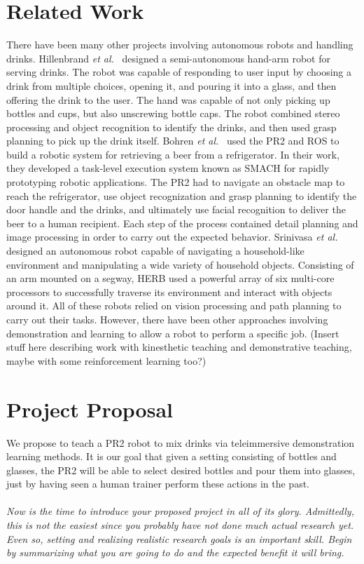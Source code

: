 \documentclass{sig-alternate}
\begin{document}
\section{Related Work}
\label{sec:related_work}
There have been many other projects involving autonomous robots and handling drinks. Hillenbrand \textit{et al.}~\cite{pouring_arm} designed a semi-autonomous hand-arm robot for serving drinks. The robot was capable of responding to user input by choosing a drink from multiple choices, opening it, and pouring it into a glass, and then offering the drink to the user. The hand was capable of not only picking up bottles and cups, but also unscrewing bottle caps. The robot combined stereo processing and object recognition to identify the drinks, and then used grasp planning to pick up the drink itself. Bohren \textit{et al.}~\cite{beer} used the PR2 and ROS to build a robotic system for retrieving a beer from a refrigerator. In their work, they developed a task-level execution system known as SMACH for rapidly prototyping robotic applications. The PR2 had to navigate an obstacle map to reach the refrigerator, use object recognization and grasp planning to identify the door handle and the drinks, and ultimately use facial recognition to deliver the beer to a human recipient. Each step of the process contained detail planning and image processing in order to carry out the expected behavior. Srinivasa \textit{et al.}~\cite{herb} designed an autonomous robot capable of navigating a household-like environment and manipulating a wide variety of household objects. Consisting of an arm mounted on a segway, HERB used a powerful array of six multi-core processors to successfully traverse its environment and interact with objects around it.
All of these robots relied on vision processing and path planning to carry out their tasks. However, there have been other approaches involving demonstration and learning to allow a robot to perform a specific job. (Insert stuff here describing work with kinesthetic teaching and demonstrative teaching, maybe with some reinforcement learning too?)

\section{Project Proposal}
\label{sec:project_proposal}We propose to teach a PR2 robot to mix drinks via
teleimmersive demonstration learning methods. It is our goal that given a 
setting consisting of bottles and glasses, the PR2 will be able to select
desired bottles and pour them into glasses, just by having seen a human
trainer perform these actions in the past.
\\
\\\emph{Now is the time to introduce your proposed project in all of its glory. Admittedly, this is not the easiest since you probably have not done much actual research yet. Even so, setting and realizing realistic research goals is an important skill. Begin by summarizing what you are going to do and the expected benefit it will bring.}
\end{document}
